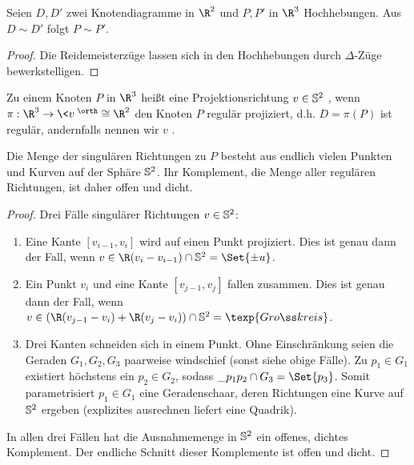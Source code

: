 \begin{lem}
    Seien $D, D'$ zwei Knotendiagramme in $\R^2$ und $P, P'$ in $\R^3$ Hochhebungen.
    Aus $D \sim D'$ folgt $P \sim P'$.
    \begin{proof}
        Die Reidemeisterzüge lassen sich in den Hochhebungen durch $\Delta$-Züge bewerkstelligen.
    \end{proof}
\end{lem}

\begin{df}
    Zu einem Knoten $P$ in $\R^3$ heißt eine Projektionsrichtung $v \in \S^2$ , wenn $\pi: \R^3 \to \<v\>^\orth \homeomorphic \R^2$ den Knoten $P$ regulär projiziert, d.h. $D = \pi(P)$ ist regulär, andernfalls nennen wir $v$ .
\end{df}

\begin{lem}
    Die Menge der singulären Richtungen zu $P$ besteht aus endlich vielen Punkten und Kurven auf der Sphäre $\S^2$.
    Ihr Komplement, die Menge aller regulären Richtungen, ist daher offen und dicht.
    \begin{proof}
        Drei Fälle singulärer Richtungen $v \in \S^2$:
        \begin{enumerate}[(1)]
            \item
                Eine Kante $[v_{i-1},v_i]$ wird auf einen Punkt projiziert.
                Dies ist genau dann der Fall, wenn $v \in \R(v_i - v_{i-1}) \cap \S^2 = \Set{\pm u}$.
            \item
                Ein Punkt $v_i$ und eine Kante $[v_{j-1}, v_j]$ fallen zusammen.
                Dies ist genau dann der Fall, wenn $v \in (\R(v_{j-1} - v_i) + \R(v_j - v_i)) \cap \S^2 = \texp{Großkreis}$.
            \item
                Drei Kanten schneiden sich in einem Punkt.
                Ohne Einschränkung seien die Geraden $G_1, G_2, G_3$ paarweise windschief (sonst siehe obige Fälle).
                Zu $p_1 \in G_1$ existiert höchstens ein $p_2 \in G_2$, sodass $\_{p_1 p_2} \cap G_3 = \Set{p_3}$.
                Somit parametrisiert $p_1 \in G_1$ eine Geradenschaar, deren Richtungen eine Kurve auf $\S^2$ ergeben (explizites ausrechnen liefert eine Quadrik).
        \end{enumerate}
        In allen drei Fällen hat die Ausnahmemenge in $\S^2$ ein offenes, dichtes Komplement.
        Der endliche Schnitt dieser Komplemente ist offen und dicht.
    \end{proof}
\end{lem}

